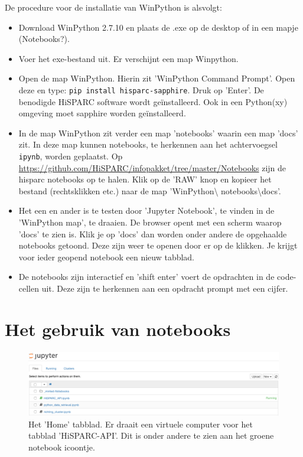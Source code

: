 De procedure voor de installatie van WinPython is alsvolgt:
\begin{itemize}
\item Download WinPython 2.7.10 en plaats de .exe op de desktop of in een mapje (Notebooks?).
\item Voer het exe-bestand uit. Er verschijnt een map Winpython.
\item Open de map WinPython. Hierin zit 'WinPython Command Prompt'. Open deze en type:
 {\tt pip install hisparc-sapphire}. Druk op 'Enter'. De benodigde HiSPARC software wordt ge\"{i}nstalleerd. 
 Ook in een Python(xy) omgeving moet sapphire worden ge\"{i}nstalleerd.
\item In de map WinPython zit verder een map 'notebooks' waarin een map 'docs' zit. In deze map kunnen notebooks, 
te herkennen aan het achtervoegsel {\tt ipynb}, worden geplaatst. 
Op \url{https://github.com/HiSPARC/infopakket/tree/master/Notebooks} zijn de hisparc notebooks op te halen. Klik 
op de 'RAW' knop en kopieer het bestand (rechtsklikken etc.) naar de map 'WinPython\textbackslash 
notebooks\textbackslash docs'.
\item Het een en ander is te testen door 'Jupyter Notebook', te vinden in de 'WinPython map', te draaien. De browser 
opent met een scherm waarop 'docs' te zien is. Klik je op 'docs' dan worden onder andere de opgehaalde notebooks 
getoond. Deze zijn weer te openen door er op de klikken. Je krijgt voor ieder geopend notebook een nieuw tabblad.
\item De notebooks zijn interactief en 'shift enter' voert de opdrachten in de code-cellen uit. Deze zijn te herkennen aan 
een opdracht prompt met een cijfer.
\end{itemize}

\section{Het gebruik van notebooks}

\begin{figure}[H]
\includegraphics[width=16cm]{home.png}
\caption{Het 'Home' tabblad. Er draait een virtuele computer voor het tabblad 'HiSPARC-API'. Dit is onder andere te zien 
aan het groene notebook icoontje.}
\end{figure}

